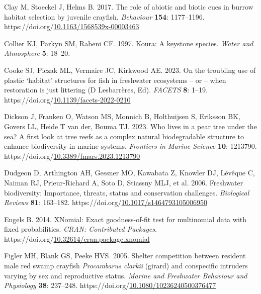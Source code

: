 \documentclass[
  letterpaper,
  DIV=11,
  numbers=noendperiod]{scrartcl}
\newlength{\cslhangindent}
\newenvironment{CSLReferences}[2] %
 {\begin{list}{}{%
  \setlength{\itemindent}{0pt}
  \setlength{\leftmargin}{0pt}
  \setlength{\parsep}{0pt}
  \ifodd #1
   \setlength{\leftmargin}{\cslhangindent}
   \setlength{\itemindent}{-1\cslhangindent}
  \fi
  \setlength{\itemsep}{#2\baselineskip}}}
 {\end{list}}
\begin{document}
\begin{CSLReferences}{1}{0}
Clay M, Stoeckel J, Helms B. 2017. The role of abiotic and biotic cues
in burrow habitat selection by juvenile crayfish. \emph{Behaviour}
\textbf{154}: 1177--1196.
https://doi.org/\href{https://doi.org/10.1163/1568539x-00003463}{10.1163/1568539x-00003463}

Collier KJ, Parkyn SM, Rabeni CF. 1997. Koura: A keystone species.
\emph{Water and Atmosphere} \textbf{5}: 18--20.

Cooke SJ, Piczak ML, Vermaire JC, Kirkwood AE. 2023. On the troubling
use of plastic {`habitat'} structures for fish in freshwater ecosystems
-- or -- when restoration is just littering (D Lesbarrères, Ed).
\emph{FACETS} \textbf{8}: 1--19.
https://doi.org/\href{https://doi.org/10.1139/facets-2022-0210}{10.1139/facets-2022-0210}

Dickson J, Franken O, Watson MS, Monnich B, Holthuijsen S, Eriksson BK,
Govers LL, Heide T van der, Bouma TJ. 2023. Who lives in a pear tree
under the sea? A first look at tree reefs as a complex natural
biodegradable structure to enhance biodiversity in marine systems.
\emph{Frontiers in Marine Science} \textbf{10}: 1213790.
https://doi.org/\href{https://doi.org/10.3389/fmars.2023.1213790}{10.3389/fmars.2023.1213790}

Dudgeon D, Arthington AH, Gessner MO, Kawabata Z, Knowler DJ, Lévêque C,
Naiman RJ, Prieur‐Richard A, Soto D, Stiassny MLJ, et al. 2006.
Freshwater biodiversity: Importance, threats, status and conservation
challenges. \emph{Biological Reviews} \textbf{81}: 163--182.
https://doi.org/\href{https://doi.org/10.1017/s1464793105006950}{10.1017/s1464793105006950}

Engels B. 2014. {XNomial}: Exact goodness-of-fit test for multinomial
data with fixed probabilities. \emph{CRAN: Contributed Packages}.
https://doi.org/\href{https://doi.org/10.32614/cran.package.xnomial}{10.32614/cran.package.xnomial}

Figler MH, Blank GS, Peeke HVS. 2005. Shelter competition between
resident male red swamp crayfish {\emph{Procambarus clarkii}} (girard)
and conspecific intruders varying by sex and reproductive status.
\emph{Marine and Freshwater Behaviour and Physiology} \textbf{38}:
237--248.
https://doi.org/\href{https://doi.org/10.1080/10236240500376477}{10.1080/10236240500376477}


\end{CSLReferences}
\end{document}
